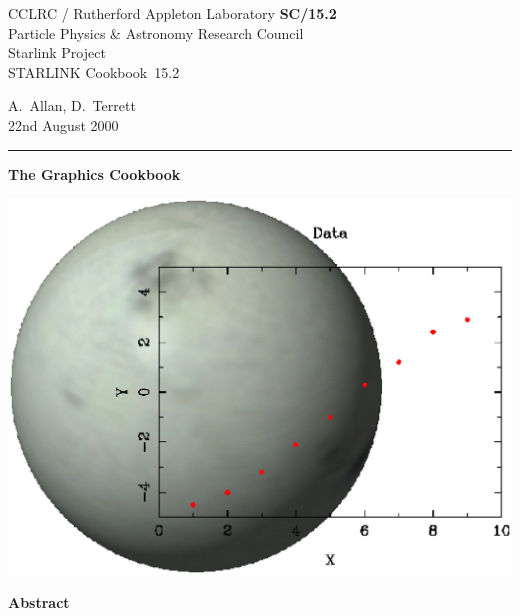 \documentclass[twoside,11pt]{article}
\newcommand{\stardoccategory}  {STARLINK Cookbook}
\newcommand{\stardocinitials}  {SC}
\newcommand{\stardocnumber}    {15.2}
\newcommand{\stardocauthors}   {A.~Allan, D.~Terrett}
\newcommand{\stardocdate}      {22nd August 2000}
\newcommand{\stardoctitle}     {The Graphics Cookbook}
\newcommand{\stardocname}{\stardocinitials /\stardocnumber}
\begin{document}
\thispagestyle{empty}

\begin{latex}
   CCLRC / {\sc Rutherford Appleton Laboratory} \hfill {\bf \stardocname}\\
   {\large Particle Physics \& Astronomy Research Council}\\
   {\large Starlink Project\\}
   {\large \stardoccategory\ \stardocnumber}
   \begin{flushright}
   \stardocauthors\\
   \stardocdate
   \end{flushright}
   \vspace{-4mm}
   \rule{\textwidth}{0.5mm}
   \vspace{5mm}
   \begin{center}
   {\Huge\bf  \stardoctitle \\ [2.5ex]}
   \end{center}
   \vspace{5mm}

   \begin{center}
   \includegraphics[scale=0.6]{sc15_cover2.eps}
   \end{center}

   \vspace{5mm}
   \begin{center}
      {\Large\bf Abstract}
   \end{center}
\end{latex}
\end{document}

